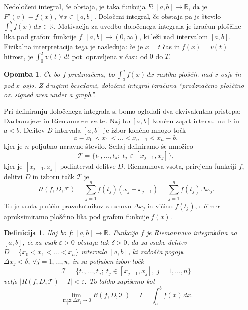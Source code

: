 \documentclass[10pt, a4paper]{article}
\newtheorem{defi}{Definicija}[section]
\newenvironment{noticeB}{%
  \tcolorbox[%
  notitle,
  empty,
  enhanced,  %
  breakable,
  coltext=black,
  colback=white, 
  fontupper=\rmfamily,
  parbox=false,
  noparskip,
  sharp corners,
  boxrule=-1pt,  %
  frame hidden,
  left=7pt,  %
  right=7pt,
  top=5pt,
  bottom=5pt,
  before skip=2.5ex plus 2pt,
  after skip=2.5ex plus 2pt,
  borderline west = {1.5pt}{-0.1pt}{blue!30!black}, %
  overlay unbroken and last={%
    \draw[color=black, line width=1.25pt]
    ($(frame.south west)+(1.pt, -0.1pt)$) -- ++(2em, 0);
  }
  ]}
{\endtcolorbox}
\newenvironment{definicija}{\begin{defi}\begin{noticeB}}{%
    \end{noticeB}\end{defi}}
\newtheorem*{opomba}{Opomba}
\newcommand{\R}{\mathbb {R}}
\newcommand{\limf}[3]{\lim_{#1 \to #2} {#3}}
\begin{document}
Nedoločeni integral, če obstaja, je taka funkcija $F: [a, b] \rightarrow \R$, da je $F'(x) = f(x),\ \forall x \in [a, b]$.
Določeni integral, če obstaja pa je število $\int_{a} ^{b} f(x)\,dx \in \R$.
Motivacija za uvedbo določenega integrala je izračun ploščine lika pod grafom funkcije $f: [a, b] \rightarrow (0, \infty)$, ki leži nad intervalom $[a, b]$.
Fizikalna interpretacija tega je naslednja: če je $x = t$ čas in $f(x) = v(t)$ hitrost, je $\int_{0} ^{T} v(t)\,dt$ pot, opravljena v času od $0$ do $T$.

\begin{opomba}
    Če bo $f$ predznačena, bo $\int_{a} ^a f(x)\,dx$ razlika ploščin nad $x$-osjo in pod $x$-osjo.
    Z drugimi besedami, določeni integral izračuna "`predznačeno ploščino oz. signed area under a graph"'.
\end{opomba}

Pri definiranju določenega integrala si bomo ogledali dva ekvivalentna pristopa: Darbouxjeve in Riemannove vsote.
Naj bo $[a, b]$ končen zaprt interval na $\R$ in $a < b$.
Delitev $D$ intervala $[a, b]$ je izbor končno mnogo točk
$$a = x_0 < x_1 < \dots < x_{n-1} < x_n = b,$$
kjer je $n$ poljubno naravno število. Sedaj definiramo še množico
$$\mathcal{T} = \{t_1, \dots, t_n;\ t_j \in [x_{j-1}, x_{j}]\},$$
kjer je $[x_{j-1}, x_j]$ podinterval delitve $D$.
Riemannova vsota, prirejena funkciji $f$, delitvi $D$ in izboru točk $\mathcal{T}$ je
$$R(f, D, \mathcal{T}) = \sum_{j = 1} ^n f(t_j) (x_j - x_{j-1}) = \sum_{j = 1} ^n f(t_j) \Delta x_j.$$
To je vsota ploščin pravokotnikov z osnovo $\Delta x_j$ in višino $f(t_j)$, s čimer aproksimiramo ploščino lika pod grafom funkcije $f(x)$.

\begin{definicija}
    Naj bo $f:[a,b] \rightarrow \R$. Funkcija $f$ je Riemannovo integrabilna na $[a, b]$, če za vsak $\varepsilon > 0$ obstaja tak $\delta > 0$, da za vsako delitev $D = \{x_0 < x_1 < \dots < x_n\}$ intervala $[a, b]$, ki zadošča pogoju $\Delta x_j < \delta,\ \forall j = 1, \dots, n$, 
    in za poljuben izbor točk $$\mathcal{T} = \{t_1, \dots, t_n;\ t_j \in [x_{j-1}, x_j],\ j = 1, \dots, n\}$$
    velja $|R(f, D, \mathcal{T}) - I| < \varepsilon$.
    To lahko zapišemo kot $$\limf{\max_j \Delta x_j}{0}{R(f, D, \mathcal{T})} = I = \int_{a} ^b f(x)\,dx.$$
\end{definicija}
\end{document}

